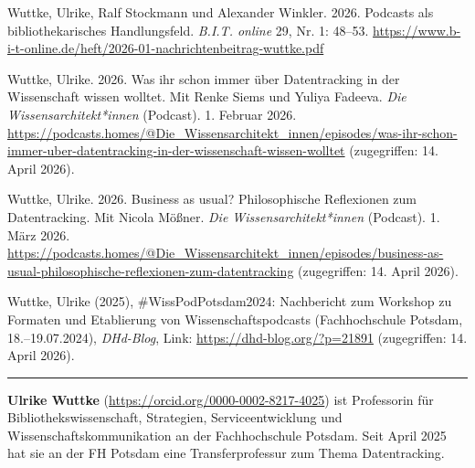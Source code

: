 \documentclass[a4paper,
fontsize=11pt,
oneside,
numbers=noperiodatend,
parskip=half-,
bibliography=totoc,
final
]{scrartcl}
\begin{document}
Wuttke, Ulrike, Ralf Stockmann und Alexander Winkler. 2026. Podcasts als
bibliothekarisches Handlungsfeld. \emph{B.I.T. online} 29, Nr. 1:
48--53.
\url{https://www.b-i-t-online.de/heft/2026-01-nachrichtenbeitrag-wuttke.pdf}

Wuttke, Ulrike. 2026. Was ihr schon immer über Datentracking in der
Wissenschaft wissen wolltet. Mit Renke Siems und Yuliya Fadeeva.
\emph{Die Wissensarchitekt*innen} (Podcast). 1. Februar 2026.
\url{https://podcasts.homes/@Die_Wissensarchitekt_innen/episodes/was-ihr-schon-immer-uber-datentracking-in-der-wissenschaft-wissen-wolltet}
(zugegriffen: 14. April 2026).

Wuttke, Ulrike. 2026. Business as usual? Philosophische Reflexionen zum
Datentracking. Mit Nicola Mößner. \emph{Die Wissensarchitekt*innen}
(Podcast). 1. März 2026.
\url{https://podcasts.homes/@Die_Wissensarchitekt_innen/episodes/business-as-usual-philosophische-reflexionen-zum-datentracking}
(zugegriffen: 14. April 2026).

Wuttke, Ulrike (2025), \#WissPodPotsdam2024: Nachbericht zum Workshop zu
Formaten und Etablierung von Wissenschaftspodcasts (Fachhochschule
Potsdam, 18.--19.07.2024), \emph{DHd-Blog}, Link:
\url{https://dhd-blog.org/?p=21891} (zugegriffen: 14. April 2026).

\begin{center}\rule{0.5\linewidth}{0.5pt}\end{center}

\textbf{Ulrike Wuttke} (\url{https://orcid.org/0000-0002-8217-4025}) ist
Professorin für Bibliothekswissenschaft, Strategien, Serviceentwicklung
und Wissenschaftskommunikation an der Fachhochschule Potsdam. Seit April
2025 hat sie an der FH Potsdam eine Transferprofessur zum Thema
Datentracking.
\end{document}
